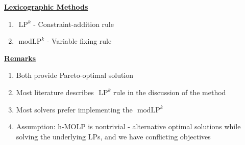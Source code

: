 \documentclass{article}
\begin{document}
\begin{multicols}{3}
\vspace{.1cm}
\noindent
 \underline{\Large {\bf Lexicographic Methods}}
\begin{enumerate}
\large
 \item $\mbox{~LP}^{k}$ - Constraint-addition rule 
 \item $\mbox{~modLP}^{k}$ - Variable fixing rule 
\end{enumerate}
\vspace{-.1cm}
\noindent
\begin{center}
\large 
{}
\end{center} 
{\Large \textbf{\underline{Remarks}}}
\begin{enumerate}
\large
\item Both provide Pareto-optimal solution
\item Most literature describes $\mbox{~LP}^{k}$ rule in the discussion of the method
\item Most solvers prefer implementing the $\mbox{~modLP}^{k}$
\item Assumption: h-MOLP is nontrivial - alternative optimal solutions while solving the underlying LPs, and we have conflicting objectives
\end{enumerate}

\end{multicols}
\end{document}

